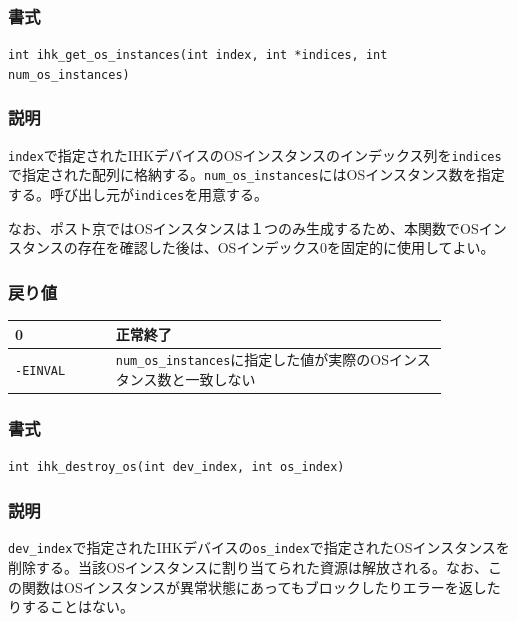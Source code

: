 \documentclass[twoside,11pt,fleqn]{book}
\begin{document}
\subsubsection*{書式}{\quad} \texttt{int ihk\_get\_os\_instances(int index, int *indices, int num\_os\_instances)}
\subsubsection*{説明}{\quad} \texttt{index}で指定されたIHKデバイスのOSインスタンスのインデックス列を\texttt{indices}で指定された配列に格納する。\texttt{num\_os\_instances}にはOSインスタンス数を指定する。呼び出し元が\texttt{indices}を用意する。

なお、ポスト京ではOSインスタンスは１つのみ生成するため、本関数でOSインスタンスの存在を確認した後は、OSインデックス0を固定的に使用してよい。

\subsubsection*{戻り値}{\quad}
\begin{table}[!h]
\footnotesize
\begin{tabular}{|p{0.20\linewidth}|p{0.66\linewidth}|} \hline
0&正常終了\\ \hline
\texttt{-EINVAL}&\texttt{num\_os\_instances}に指定した値が実際のOSインスタンス数と一致しない\\ \hline
\end{tabular}
\vspace{-0em}
\end{table}
\FloatBarrier

\subsubsection{}
\subsubsection*{書式}{\quad} \verb:int ihk_destroy_os(int dev_index, int os_index):
\subsubsection*{説明}{\quad} \texttt{dev\_index}で指定されたIHKデバイスの\texttt{os\_index}で指定されたOSインスタンスを削除する。当該OSインスタンスに割り当てられた資源は解放される。なお、この関数はOSインスタンスが異常状態にあってもブロックしたりエラーを返したりすることはない。
\end{document}
